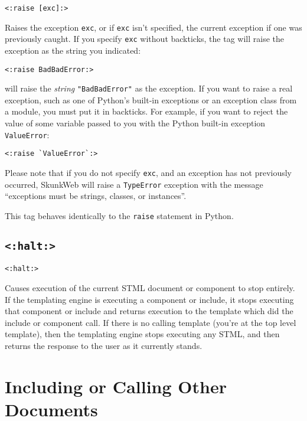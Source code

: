 \documentclass{manual}
\begin{document}
\begin{verbatim}<:raise [exc]:>\end{verbatim}

Raises the exception \texttt{exc}, or if \texttt{exc} isn't
specified, the current exception if
one was previously caught. If you specify \texttt{exc} without backticks,
the tag will raise the exception as the string you indicated:

\begin{verbatim}
<:raise BadBadError:>
\end{verbatim}

will raise the \emph{string} \texttt{"BadBadError"} as the exception.
If you want to raise a real exception, such as one of Python's built-in
exceptions or an exception class from a module, you must put it in backticks.
For example, if you want to reject the value of some variable passed to you
with the Python built-in exception \texttt{ValueError}:

\begin{verbatim}
<:raise `ValueError`:>
\end{verbatim}

Please note that if you do not specify \texttt{exc}, and an exception
has not previously occurred, SkunkWeb will raise a \texttt{TypeError}
exception with the message ``exceptions must be strings, classes, or
instances''.

This tag behaves identically to the \texttt{raise} statement in Python.




\section{\texttt{<:halt:>}}
\label{taghalt}
\begin{verbatim}<:halt:>\end{verbatim}

Causes execution of the current STML document or component to stop
entirely. If the templating engine is executing a component or
include, it stops executing that component or include and returns
execution to the template which did the include or component call.  If
there is no calling template (you're at the top level template),
then the templating engine stops executing any STML, and then returns
the response to the user as it currently stands.


\chapter{Including or Calling Other Documents}
\label{stmlrefexecute}
\end{document}
